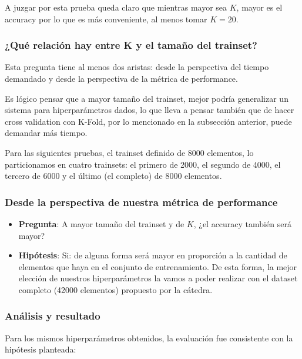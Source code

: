A juzgar por esta prueba queda claro que mientras mayor sea $K$, mayor es el accuracy por lo que es más conveniente, al menos tomar $K = 20$.

\subsubsection{¿Qué relación hay entre K y el tamaño del trainset?}

Esta pregunta tiene al menos dos aristas: desde la perspectiva del tiempo demandado y desde la perspectiva de la métrica de performance.

Es lógico pensar que a mayor tamaño del trainset, mejor podría generalizar un sistema para hiperparámetros dados, lo que lleva a pensar también que de hacer cross validation con K-Fold, por lo mencionado en la subsección anterior, puede demandar más tiempo.

Para las siguientes pruebas, el trainset definido de 8000 elementos, lo particionamos en cuatro trainsets: el primero de 2000, el segundo de 4000, el tercero de 6000 y el último (el completo) de 8000 elementos.

\subsubsection*{Desde la perspectiva de nuestra métrica de performance}\label{KFoldTrainSizeAcc}

\begin{itemize}
    \item \textbf{Pregunta}: A mayor tamaño del trainset y de $K$, ¿el accuracy también será mayor?
    \item \textbf{Hipótesis}: Si: de alguna forma será mayor en proporción a la cantidad de elementos que haya en el conjunto de entrenamiento. De esta forma, la mejor elección de nuestros hiperparámetros la vamos a poder realizar con el dataset completo (42000 elementos) propuesto por la cátedra.
\end{itemize}

\subsubsection*{Análisis y resultado}

Para los mismos hiperparámetros obtenidos, la evaluación fue consistente con la hipótesis planteada:

